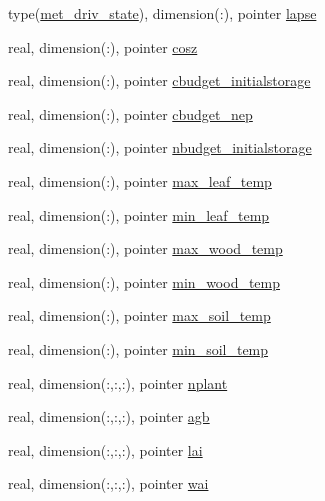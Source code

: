 \begin{DoxyCompactItemize}
\item 
type(\hyperlink{structmet__driver__coms_1_1met__driv__state}{met\+\_\+driv\+\_\+state}), dimension(\+:), pointer \hyperlink{structed__state__vars_1_1edtype_a892e63644a635b6d4d0371bce1412a77}{lapse}
\item 
real, dimension(\+:), pointer \hyperlink{structed__state__vars_1_1edtype_ab5a977e1fb91a16e587e1916a2b4b32a}{cosz}
\item 
real, dimension(\+:), pointer \hyperlink{structed__state__vars_1_1edtype_ac23c866b5655e964479a685cc455b918}{cbudget\+\_\+initialstorage}
\item 
real, dimension(\+:), pointer \hyperlink{structed__state__vars_1_1edtype_a70a122a18c778de607c5d2cfe86fb89e}{cbudget\+\_\+nep}
\item 
real, dimension(\+:), pointer \hyperlink{structed__state__vars_1_1edtype_aa90daae4ad61c76d705a2d96a3b4d7e2}{nbudget\+\_\+initialstorage}
\item 
real, dimension(\+:), pointer \hyperlink{structed__state__vars_1_1edtype_a0ba21be8babf8fee9a77d7c610b45def}{max\+\_\+leaf\+\_\+temp}
\item 
real, dimension(\+:), pointer \hyperlink{structed__state__vars_1_1edtype_ae0e1bf66e43b7150c1fc5c5618d72d29}{min\+\_\+leaf\+\_\+temp}
\item 
real, dimension(\+:), pointer \hyperlink{structed__state__vars_1_1edtype_a88605cd10978b60e79cf8425ffafd2e1}{max\+\_\+wood\+\_\+temp}
\item 
real, dimension(\+:), pointer \hyperlink{structed__state__vars_1_1edtype_a277882b2a5b1992e66699704d9dc82af}{min\+\_\+wood\+\_\+temp}
\item 
real, dimension(\+:), pointer \hyperlink{structed__state__vars_1_1edtype_a1af020b5a82ed3418070df042775561a}{max\+\_\+soil\+\_\+temp}
\item 
real, dimension(\+:), pointer \hyperlink{structed__state__vars_1_1edtype_ab76c9b6b9b935b292d57725a9ccb5f3e}{min\+\_\+soil\+\_\+temp}
\item 
real, dimension(\+:,\+:,\+:), pointer \hyperlink{structed__state__vars_1_1edtype_adfb8a0209603d626ba295910494e0315}{nplant}
\item 
real, dimension(\+:,\+:,\+:), pointer \hyperlink{structed__state__vars_1_1edtype_a12a78f6920af99b8e190ca6ade6ba2b1}{agb}
\item 
real, dimension(\+:,\+:,\+:), pointer \hyperlink{structed__state__vars_1_1edtype_a363af34dbfad6a365d09928d640994dc}{lai}
\item 
real, dimension(\+:,\+:,\+:), pointer \hyperlink{structed__state__vars_1_1edtype_aec54ce8ea6b7de382185f26412cfe797}{wai}

\end{DoxyCompactItemize}
